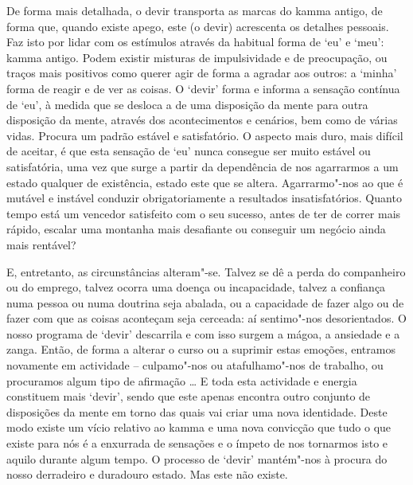 De forma mais detalhada, o devir transporta as marcas do kamma antigo, de forma que, quando existe apego, este (o devir) acrescenta os detalhes pessoais. Faz isto por lidar com os estímulos através da habitual forma de `eu' e `meu': kamma antigo. Podem existir misturas de impulsividade e de preocupação, ou traços mais positivos como querer agir de forma a agradar aos outros: a `minha' forma de reagir e de ver as coisas. O `devir' forma e informa a sensação contínua de `eu', à medida que se desloca a de uma disposição da mente para outra disposição da mente, através dos acontecimentos e cenários, bem como de várias vidas. Procura um padrão estável e satisfatório. O aspecto mais duro, mais difícil de aceitar, é que esta sensação de `eu' nunca consegue ser muito estável ou satisfatória, uma vez que surge a partir da dependência de nos agarrarmos a um estado qualquer de existência, estado este que se altera. Agarrarmo"-nos ao que é mutável e instável conduzir obrigatoriamente a resultados insatisfatórios. Quanto tempo está um vencedor satisfeito com o seu sucesso, antes de ter de correr mais rápido, escalar uma montanha mais desafiante ou conseguir um negócio ainda mais rentável?

E, entretanto, as circunstâncias alteram"-se. Talvez se dê a perda do companheiro ou do emprego, talvez ocorra uma doença ou incapacidade, talvez a confiança numa pessoa ou numa doutrina seja abalada, ou a capacidade de fazer algo ou de fazer com que as coisas aconteçam seja cerceada: aí sentimo"-nos desorientados. O nosso programa de `devir' descarrila e com isso surgem a mágoa, a ansiedade e a zanga. Então, de forma a alterar o curso ou a suprimir estas emoções, entramos novamente em actividade -- culpamo"-nos ou atafulhamo"-nos de trabalho, ou procuramos algum tipo de afirmação \ldots{} E toda esta actividade e energia constituem mais `devir', sendo que este apenas encontra outro conjunto de disposições da mente em torno das quais vai criar uma nova identidade. Deste modo existe um vício relativo ao kamma e uma nova convicção que tudo o que existe para nós é a enxurrada de sensações e o ímpeto de nos tornarmos isto e aquilo durante algum tempo. O processo de `devir' mantém"-nos à procura do nosso derradeiro e duradouro estado. Mas este não existe.

